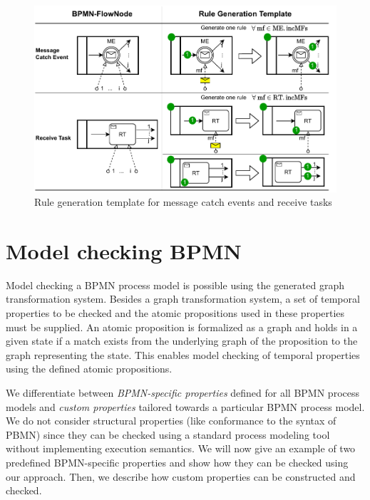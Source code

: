\documentclass[runningheads]{llncs}
\begin{document}
\begin{figure}[ht]
    \centering
    \includegraphics[width=1\textwidth]{images/catch_messages.pdf}
    \caption{Rule generation template for message catch events and receive tasks}
    \label{fig:catchMessageTemplates}
\end{figure}


\section{Model checking BPMN} \label{sec:modelChecking}

Model checking a BPMN process model is possible using the generated graph transformation system.
Besides a graph transformation system, a set of temporal properties to be checked and the atomic propositions used in these properties must be supplied.
An atomic proposition is formalized as a graph and holds in a given state if a match exists from the underlying graph of the proposition to the graph representing the state.
This enables model checking of temporal properties using the defined atomic propositions.

We differentiate between \emph{BPMN-specific properties} defined for all BPMN process models and \emph{custom properties} tailored towards a particular BPMN process model.
We do not consider structural properties (like conformance to the syntax of PBMN) since they can be checked using a standard process modeling tool without implementing execution semantics.
We will now give an example of two predefined BPMN-specific properties and show how they can be checked using our approach.
Then, we describe how custom properties can be constructed and checked.
\end{document}
